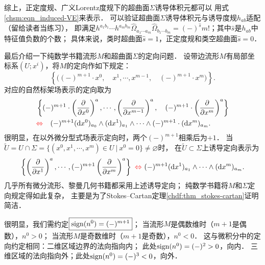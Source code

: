综上，正定度规、广义Lorentz度规下的超曲面$\Sigma$诱导体积元都可以
用式\eqref{chsm:eqn_induced-VE}来表示．
可以验证超曲面$\Sigma$诱导体积元与诱导度规$h_{ab}$适配（留给读者当练习），
即满足$h^{a_1b_1}\cdots h^{a_{m}b_{m}} \hat{\Omega}_{a_1 \cdots a_{m}} \hat{\Omega}_{b_1 \cdots b_{m}}
= (-)^{\hat{s}} m!$；其中$\hat{s}$是$h_{ab}$中特征值负数的个数；
具体来说，类时超曲面$\hat{s}=1$，正定度规和类空超曲面$\hat{s}=0$．



最后介绍一下纯数学书籍\cite[\S 1.8]{chen-li-2023-2ed-v1}流形$M$和超曲面$\Sigma$的定向问题．
设带边流形$M$有局部坐标系$(U;x^i)$，将$M$的定向作如下规定： 
\begin{equation}
  \left\{\bigl((-)^{m+1}\cdot x^0,\quad x^1,\cdots,x^{m-1},\quad (-)^{m+1}\cdot x^m \bigr)\right\}.
\end{equation}
对应的自然标架场表示的定向取为
\begin{subequations}\label{chsm:eqn_induced-orientation-nt}
\begin{align}
    &\left\{ (-)^{m+1}\cdot \left(\frac{\partial }{\partial x^0}\right)^a, \cdots,
    \left(\frac{\partial }{\partial x^{m-1}}\right)^a, \quad 
     (-)^{m+1}\cdot \left(\frac{\partial }{\partial x^m}\right)^a \right\} \\
    &{\color{red}\Leftrightarrow\quad } 
    (-)^{m+1} ( {\rm d}x^0)_{a_0} \wedge ({\rm d}x^1)_{a_1} \wedge \cdots\wedge (-)^{m+1}\cdot({\rm d}x^m)_{a_m}.
\end{align}
\end{subequations}
很明显，在以外微分型式场表示定向时，两个$(-)^{m+1}$相乘后为$+1$．
当$\widetilde{U}=U\cap \Sigma =\{(x^0,x^1,\cdots,x^m)\in U \ | \ x^0=0 \}\neq \varnothing $时，
在$\widetilde{U}\subset \Sigma$上{\heiti 诱导定向}表示为
\setlength{\mathindent}{0em}
\begin{equation}\label{chsm:eqn_induced-orientation-nc}
    \left\{
    \left(\frac{\partial }{\partial x^1}\right)^a,\cdots,
    (-)^{m+1} \left(\frac{\partial }{\partial x^{m}}\right)^a\right\}
    {\ \color{red}\Leftrightarrow \   } 
    (-)^{m+1} ({\rm d}x^1)_{a_1} \wedge \cdots\wedge({\rm d}x^{m})_{a_{m}}.
\end{equation}\setlength{\mathindent}{2em}
几乎所有微分流形、黎曼几何书籍都采用上述诱导定向；
纯数学书籍将$M$和$\Sigma$定向规定得如此复杂，
主要是为了Stokes--Cartan定理\ref{chdf:thm_stokes-cartan}证明简洁．

很明显，我们需约定$\boxed{{\rm sign}(n^0)=(-)^{m+1}}$；
当流形$M$是偶数维时（$m+1$是偶数），$n^0 > 0$；
当流形$M$是奇数维时（$m+1$是奇数），$n^0 < 0$．
这与微积分中的定向约定相同：二维区域边界的法向指向内；
此处${\rm sign}(n^0)=(-)^{2}>0$，向内．
三维区域的法向指向外；此处${\rm sign}(n^0)=(-)^{3}<0$，向外．


